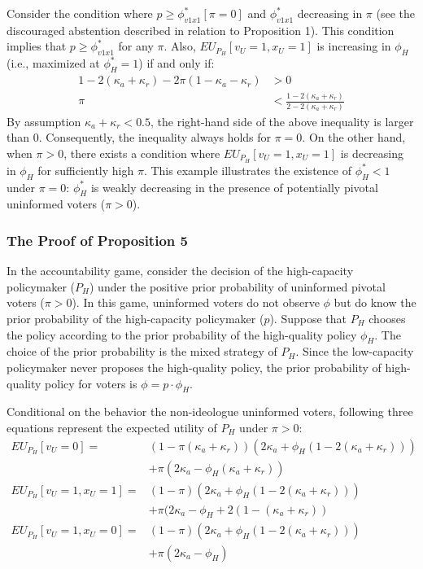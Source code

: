 \par Consider the condition where $p \geq \phi^*_{v1x1}[\pi=0]$ and $\phi^*_{v1x1}$ decreasing in $\pi$ (see the discouraged abstention described in relation to Proposition 1). This condition implies that $p \geq \phi^*_{v1x1}$ for any $\pi$. Also, $EU_{P_H}[v_U=1,x_U=1]$ is increasing in $\phi_H$ (i.e., maximized at $\phi^*_H=1$) if and only if:
\begin{align*}
1-2(\kappa_a+\kappa_r)-2\pi(1-\kappa_a-\kappa_r)&>0\\
\pi &< \frac{1-2(\kappa_a+\kappa_r)}{2-2(\kappa_a+\kappa_r)}
\end{align*}
\noindent By assumption $\kappa_a+\kappa_r<0.5$, the right-hand side of the above inequality is larger than $0$. Consequently, the inequality always holds for $\pi=0$. On the other hand, when $\pi>0$, there exists a condition where $EU_{P_H}[v_U=1,x_U=1]$ is decreasing in $\phi_H$ for sufficiently high $\pi$. This example illustrates the existence of $\phi^*_H<1$ under $\pi=0$: $\phi^*_H$ is weakly decreasing in the presence of potentially pivotal uninformed voters ($\pi>0$). 

\subsubsection{The Proof of Proposition 5}

\par In the accountability game, consider the decision of the high-capacity policymaker ($P_H$) under the positive prior probability of uninformed pivotal voters ($\pi>0$). In this game, uninformed voters do not observe $\phi$ but do know the prior probability of the high-capacity policymaker ($p$). Suppose that $P_H$ chooses the policy according to the prior probability of the high-quality policy $\phi_H$. The choice of the prior probability is the mixed strategy of $P_H$. Since the low-capacity policymaker never proposes the high-quality policy, the prior probability of high-quality policy for voters is $\phi = p \cdot \phi_H$. 

\par Conditional on the behavior the non-ideologue uninformed voters, following three equations represent the expected utility of $P_H$ under $\pi > 0$:
\begin{align*}
EU_{P_H}[v_U = 0] =& (1-\pi (\kappa_{a} + \kappa_{r})) (2 \kappa_{a} + \phi_H (1- 2(\kappa_{a} + \kappa_{r}))) \\ &+\pi (2 \kappa_{a} - \phi_H (\kappa_{a} + \kappa_{r}))  \\
EU_{P_H}[v_U = 1, x_U = 1] =& (1-\pi) (2 \kappa_{a} + \phi_H (1- 2(\kappa_{a} + \kappa_{r})))  \\ &+ \pi (2 \kappa_{a} - \phi_H + 2 (1- (\kappa_{a} + \kappa_{r}))  \\
EU_{P_H}[v_U = 1, x_U = 0] =& (1-\pi) (2 \kappa_{a} + \phi_H (1- 2(\kappa_{a} + \kappa_{r})))  \\ &+ \pi (2 \kappa_{a} - \phi_H) 
\end{align*}

